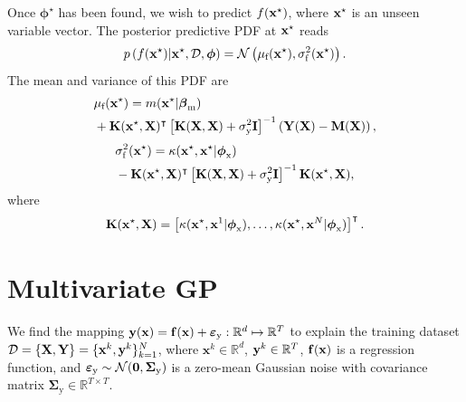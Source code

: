 \documentclass[iicol,sn-basic]{sn-jnl}%
\begin{document}
\begin{appendices}
Once ${\boldsymbol \phi^\star}$ has been found, we wish to predict $f({\bf x}^\star)$, where ${\bf x}^\star$ is an unseen variable vector.
The posterior predictive PDF at ${\bf x}^\star$ reads
\begin{equation}\label{EqA5}
	p\left(f({\bf x}^\star)|{\bf x}^\star,\mathcal{D},\boldsymbol \phi\right) = \mathcal{N}\left(\mu_\text{f}({\bf x}^\star),\sigma_\text{f}^2({\bf x}^\star)\right).
\end{equation}
The mean and variance of this PDF are
\begin{equation}\label{EqA6}
	\begin{aligned}
	& \mu_\text{f}({\bf x}^\star)=m({\bf x}^\star|\boldsymbol \beta_{\text{m}}) \\
	& + {\bf K}({\bf x}^\star,{\bf X})^\intercal \left[ {\bf K}({\bf X},{\bf X})+\sigma^2_\text{y} {\bf I}\right]^{-1} \left({\bf Y}({\bf X})-{\bf M} ({\bf X})\right),
	\end{aligned}
\end{equation}
\begin{equation}\label{EqA7}
	\begin{aligned}
	& \sigma_\text{f}^2({\bf x}^\star)=\kappa({\bf x}^\star,{\bf x}^\star|\boldsymbol \phi_{\text{x}})\\
	& -{\bf K}({\bf x}^\star,{\bf X})^\intercal \left[ {\bf K}({\bf X},{\bf X})+\sigma^2_\text{y} {\bf I}\right]^{-1} {\bf K}({\bf x}^\star,{\bf X}),
	\end{aligned}
\end{equation}
where
\begin{equation}\label{EqA8}
	{\bf K}({\bf x}^\star,{\bf X})= \left[\kappa({\bf x}^\star,{\bf x}^1|\boldsymbol \phi_{\text{x}}),\dots,\kappa({\bf x}^\star,{\bf x}^N|\boldsymbol \phi_{\text{x}})\right]^\intercal.
\end{equation}

\section{Multivariate GP}\label{AppB}
\setcounter{equation}{0} %
\renewcommand{\theequation}{B.\arabic{equation}} %

We find the mapping ${\bf y}({\bf x})={\bf f}({\bf x}) + \boldsymbol{\varepsilon}_\text{y}: \mathbb{R}^d \mapsto \mathbb{R}^T$ to explain the training dataset $\mathcal{D}=\left\{ {\bf X},{\bf Y}\right\}=\{{\bf x}^k,{\bf y}^k\}_{k=1}^N$, where $\textbf{x}^k\in\mathbb{R}^d$, ${\bf y}^k\in\mathbb{R}^T$, ${\bf f}({\bf x})$ is a regression function, and $\boldsymbol{\varepsilon}_\text{y} \sim \mathcal{N}({\bf 0},\boldsymbol{\Sigma}_\text{y})$ is a zero-mean Gaussian noise with covariance matrix $\boldsymbol{\Sigma}_\text{y} \in \mathbb{R}^{T \times T}$.


\end{appendices}
\end{document}
